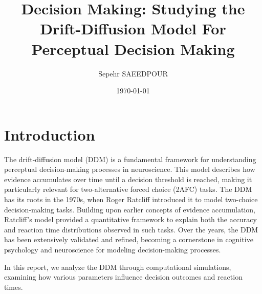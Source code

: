 \documentclass[11pt,a4paper]{article}
\title{Decision Making: Studying the Drift-Diffusion Model For Perceptual Decision Making}
\author{Sepehr SAEEDPOUR}
\date{\today}
\begin{document}
\maketitle

\section{Introduction}


The drift-diffusion model (DDM) is a fundamental framework for understanding perceptual decision-making processes in neuroscience. This model describes how evidence accumulates over time until a decision threshold is reached, making it particularly relevant for two-alternative forced choice (2AFC) tasks.
The DDM has its roots in the 1970s, when Roger Ratcliff introduced it to model two-choice decision-making tasks. Building upon earlier concepts of evidence accumulation, Ratcliff's model provided a quantitative framework to explain both the accuracy and reaction time distributions observed in such tasks. Over the years, the DDM has been extensively validated and refined, becoming a cornerstone in cognitive psychology and neuroscience for modeling decision-making processes.

In this report, we analyze the DDM through computational simulations, examining how various parameters influence decision outcomes and reaction times.



\end{document}
